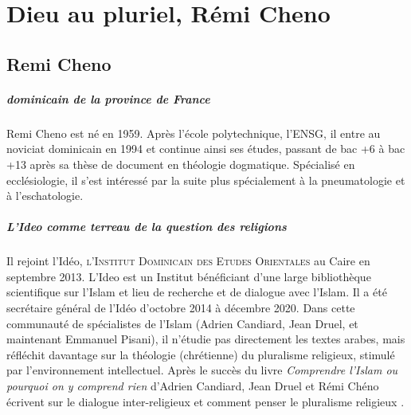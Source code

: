 \chapter{Dieu au pluriel, Rémi Cheno}
\section{Remi Cheno}

\paragraph{dominicain de la province de France} Remi Cheno est né en 1959. Après l'école polytechnique, l'ENSG, il entre au noviciat dominicain en 1994 et continue ainsi ses études, passant de bac +6 à bac +13 après sa thèse de document en théologie dogmatique. Spécialisé en ecclésiologie, il s’est intéressé par la suite plus spécialement à la pneumatologie et à l’eschatologie. 

\paragraph{L'Ideo comme terreau de la question des religions }Il rejoint l’Idéo, \textsc{l'Institut Dominicain des Etudes Orientales} au Caire en septembre 2013.  L'Ideo est un Institut bénéficiant d'une large bibliothèque scientifique sur l'Islam et lieu de recherche et de dialogue avec l'Islam. Il a été secrétaire général de l’Idéo d’octobre 2014 à décembre 2020. Dans cette communauté de spécialistes de l'Islam (Adrien Candiard, Jean Druel,  et maintenant Emmanuel Pisani), il n'étudie pas directement les textes arabes, mais réfléchit davantage sur la théologie (chrétienne) du pluralisme religieux, stimulé par l'environnement intellectuel. Après le succès du livre \textit{Comprendre l'Islam ou pourquoi on y comprend rien} d'Adrien Candiard, Jean Druel et Rémi Chéno écrivent sur le dialogue inter-religieux et comment penser le pluralisme religieux . 



